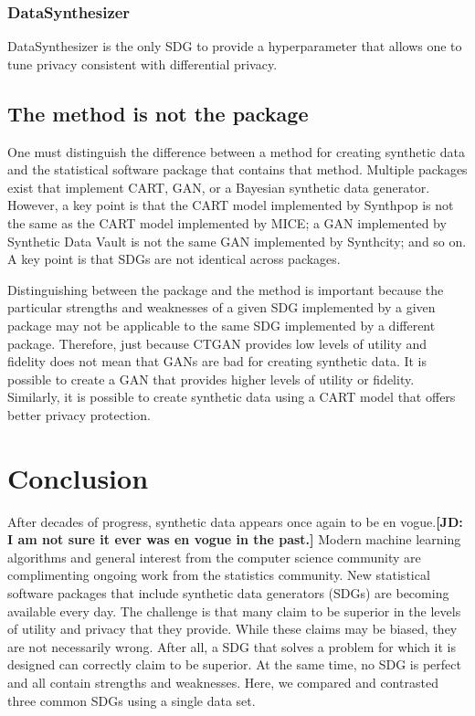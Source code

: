 \documentclass[runningheads]{llncs}
\newcommand{\jd}[1]{\scriptsize {\bf \color{red}[JD: #1]}\normalsize}
\begin{document}
\subsubsection{DataSynthesizer} 

DataSynthesizer is the only SDG to provide a hyperparameter that allows one to tune privacy consistent with differential privacy.

\subsection{The method is not the package} 

One must distinguish the difference between a method for creating synthetic data and the statistical software package that contains that method.  Multiple packages exist that implement CART, GAN, or a Bayesian synthetic data generator.  However, a key point is that the CART model implemented by Synthpop is not the same as the CART model implemented by MICE; a GAN implemented by Synthetic Data Vault is not the same GAN implemented by Synthcity; and so on.  A key point is that SDGs are not identical across packages.  

Distinguishing between the package and the method is important because the particular strengths and weaknesses of a given SDG implemented by a given package may not be applicable to the same SDG implemented by a different package.  Therefore, just because CTGAN provides low levels of utility and fidelity does not mean that GANs are bad for creating synthetic data.  It is possible to create a GAN that provides higher levels of utility or fidelity.  Similarly, it is possible to create synthetic data using a CART model that offers better privacy protection.  

\section{Conclusion}\label{sec:conclusion}

After decades of progress, synthetic data appears once again to be en vogue.\jd{I am not sure it ever was en vogue in the past.}  Modern machine learning algorithms and general interest from the computer science community are complimenting ongoing work from the statistics community.  New statistical software packages that include synthetic data generators (SDGs) are becoming available every day.  The challenge is that many claim to be superior in the levels of utility and privacy that they provide.  While these claims may be biased, they are not necessarily wrong.  After all, a SDG that solves a problem for which it is designed can correctly claim to be superior.  At the same time, no SDG is perfect and all contain strengths and weaknesses.  Here, we compared and contrasted three common SDGs using a single data set.
\end{document}
